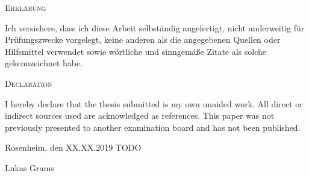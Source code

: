 {
\large
\thispagestyle{empty}
\vspace*{\fill}

\noindent
\textsc{Erklärung}

\medskip

\noindent
Ich versichere, dass ich diese Arbeit selbständig angefertigt, nicht anderweitig für Prüfungszwecke vorgelegt, 
keine anderen als die angegebenen Quellen oder Hilfsmittel verwendet sowie wörtliche und
sinngemäße Zitate als solche gekennzeichnet habe.

\bigskip

\noindent
\textsc{Declaration}

\medskip

\noindent
I hereby declare that the thesis submitted is my own unaided work. 
All direct or indirect sources used are acknowledged as references. 
This paper was not previously presented to another examination board and has not been published.

\bigskip

\noindent
Rosenheim, den XX.XX.2019 TODO

\vspace*{2cm}

\noindent
Lukas Grams
}